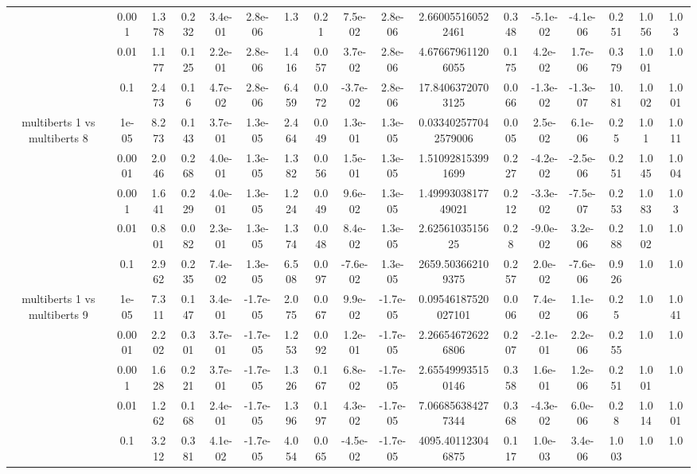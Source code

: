 \begin{tabular}{|c|c|c|c|c|c|c|c|c|c|c|c|c|c|c|c|c|}
 & 0.001 & 1.378 & 0.232 & 3.4e-01 & 2.8e-06 & 1.3 & 0.21 & 7.5e-02 & 2.8e-06 & 2.660055160522461 & 0.348 & -5.1e-02 & -4.1e-06 & 0.251 & 1.056 & 1.03 \\
 & 0.01 & 1.177 & 0.125 & 2.2e-01 & 2.8e-06 & 1.416 & 0.057 & 3.7e-02 & 2.8e-06 & 4.676679611206055 & 0.175 & 4.2e-02 & 1.7e-06 & 0.379 & 1.001 & 1.0 \\
 & 0.1 & 2.473 & 0.16 & 4.7e-02 & 2.8e-06 & 6.459 & 0.072 & -3.7e-02 & 2.8e-06 & 17.84063720703125 & 0.066 & -1.3e-02 & -1.3e-07 & 10.81 & 1.002 & 1.001 \\
\hline
\multirow{5}{*}{multiberts 1 vs multiberts 8} & 1e-05 & 8.273 & 0.143 & 3.7e-01 & 1.3e-05 & 2.464 & 0.049 & 1.3e-01 & 1.3e-05 & 0.033402577042579006 & 0.005 & 2.5e-02 & 6.1e-06 & 0.25 & 1.01 & 1.011 \\
 & 0.0001 & 2.046 & 0.268 & 4.0e-01 & 1.3e-05 & 1.382 & 0.056 & 1.5e-01 & 1.3e-05 & 1.510928153991699 & 0.227 & -4.2e-02 & -2.5e-06 & 0.251 & 1.045 & 1.004 \\
 & 0.001 & 1.641 & 0.229 & 4.0e-01 & 1.3e-05 & 1.224 & 0.049 & 9.6e-02 & 1.3e-05 & 1.4999303817749021 & 0.212 & -3.3e-02 & -7.5e-07 & 0.253 & 1.083 & 1.03 \\
 & 0.01 & 0.801 & 0.082 & 2.3e-01 & 1.3e-05 & 1.374 & 0.048 & 8.4e-02 & 1.3e-05 & 2.6256103515625 & 0.28 & -9.0e-02 & 3.2e-06 & 0.288 & 1.002 & 1.0 \\
 & 0.1 & 2.962 & 0.235 & 7.4e-02 & 1.3e-05 & 6.508 & 0.097 & -7.6e-02 & 1.3e-05 & 2659.503662109375 & 0.257 & 2.0e-02 & -7.6e-06 & 0.926 & 1.0 & 1.0 \\
\hline
\multirow{5}{*}{multiberts 1 vs multiberts 9} & 1e-05 & 7.311 & 0.147 & 3.4e-01 & -1.7e-05 & 2.075 & 0.067 & 9.9e-02 & -1.7e-05 & 0.09546187520027101 & 0.006 & 7.4e-02 & 1.1e-06 & 0.25 & 1.0 & 1.041 \\
 & 0.0001 & 2.202 & 0.301 & 3.7e-01 & -1.7e-05 & 1.253 & 0.092 & 1.2e-01 & -1.7e-05 & 2.266546726226806 & 0.207 & -2.1e-01 & 2.2e-06 & 0.255 & 1.0 & 1.0 \\
 & 0.001 & 1.628 & 0.221 & 3.7e-01 & -1.7e-05 & 1.326 & 0.167 & 6.8e-02 & -1.7e-05 & 2.655499935150146 & 0.358 & 1.6e-01 & 1.2e-06 & 0.251 & 1.001 & 1.0 \\
 & 0.01 & 1.262 & 0.168 & 2.4e-01 & -1.7e-05 & 1.396 & 0.197 & 4.3e-02 & -1.7e-05 & 7.066856384277344 & 0.368 & -4.3e-02 & 6.0e-06 & 0.28 & 1.014 & 1.001 \\
 & 0.1 & 3.212 & 0.381 & 4.1e-02 & -1.7e-05 & 4.054 & 0.065 & -4.5e-02 & -1.7e-05 & 4095.401123046875 & 0.117 & 1.0e-03 & 3.4e-06 & 1.003 & 1.0 & 1.0 \\

\end{tabular}
